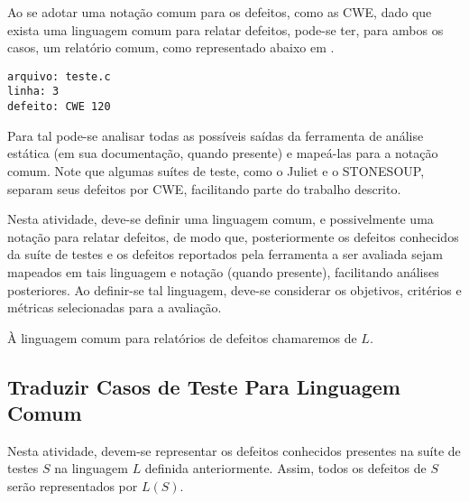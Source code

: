 Ao se adotar uma notação comum para os defeitos, como as CWE, dado que exista uma linguagem comum para relatar defeitos, pode-se ter, para ambos os casos, um relatório comum, como representado abaixo em .
\begin{lstlisting}[breaklines=true, caption=Relatório comum, label=relatorio_comum]
arquivo: teste.c
linha: 3
defeito: CWE 120
\end{lstlisting}
Para tal pode-se analisar todas as possíveis saídas da ferramenta de análise estática (em sua documentação, quando presente) e mapeá-las para a notação comum. Note que algumas suítes de teste, como o Juliet e o STONESOUP, separam seus defeitos por CWE, facilitando parte do trabalho descrito.

Nesta atividade, deve-se definir uma linguagem comum, e possivelmente uma notação para relatar defeitos, de modo que, posteriormente os defeitos conhecidos da suíte de testes e os defeitos reportados pela ferramenta a ser avaliada sejam mapeados em tais linguagem e notação (quando presente), facilitando análises posteriores. Ao definir-se tal linguagem, deve-se considerar os objetivos, critérios e métricas selecionadas para a avaliação.

À linguagem comum para relatórios de defeitos chamaremos de $L$.

\subsection{Traduzir Casos de Teste Para Linguagem Comum}

Nesta atividade, devem-se representar os defeitos conhecidos presentes na suíte de testes $S$ na linguagem $L$ definida anteriormente.
Assim, todos os defeitos de $S$ serão representados por $L(S)$.

